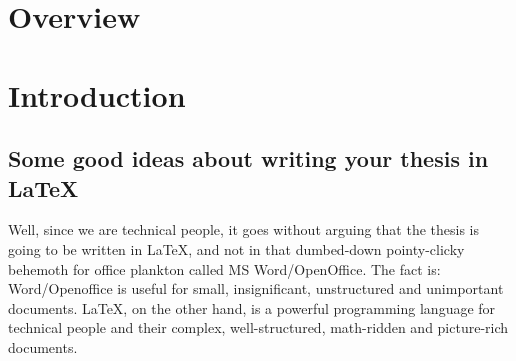 \documentclass[a4paper,11pt,phdthesis,twoside,oneandhalfspace,pdflatex]{cssethesis} %
\begin{document}


\frontmatter					%

\thesistitlepage				%

\thesiscopyrightpage			%

\thesisdeclarationpage			%



\tableofcontents				%










\mainmatter	%



\chapter{Overview}





\chapter{Introduction}

\section{Some good ideas about writing your thesis in LaTeX}

Well, since we are technical people, it goes without arguing that
the thesis is going to be written in LaTeX, and not in that
dumbed-down pointy-clicky behemoth for office plankton called MS
Word/OpenOffice. The fact is: Word/Openoffice is useful for small,
insignificant, unstructured and unimportant documents. LaTeX, on
the other hand, is a powerful programming language for technical
people and their complex, well-structured, math-ridden and
picture-rich documents.
\end{document}
